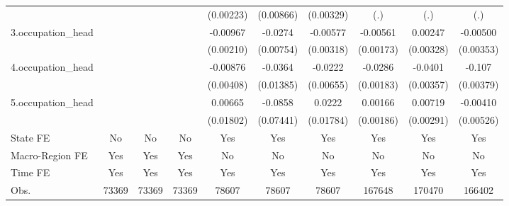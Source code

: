 \begin{table}[htbp]
{\begin{tabular}{l*{9}{c}}
            &                     &                     &                     &   (0.00223)         &   (0.00866)         &   (0.00329)         &         (.)         &         (.)         &         (.)         \\
3.occupation_head&                     &                     &                     &    -0.00967\sym{***}&     -0.0274\sym{***}&    -0.00577\sym{*}  &    -0.00561\sym{***}&     0.00247         &    -0.00500         \\
            &                     &                     &                     &   (0.00210)         &   (0.00754)         &   (0.00318)         &   (0.00173)         &   (0.00328)         &   (0.00353)         \\
4.occupation_head&                     &                     &                     &    -0.00876\sym{**} &     -0.0364\sym{***}&     -0.0222\sym{***}&     -0.0286\sym{***}&     -0.0401\sym{***}&      -0.107\sym{***}\\
            &                     &                     &                     &   (0.00408)         &   (0.01385)         &   (0.00655)         &   (0.00183)         &   (0.00357)         &   (0.00379)         \\
5.occupation_head&                     &                     &                     &     0.00665         &     -0.0858         &      0.0222         &     0.00166         &     0.00719\sym{**} &    -0.00410         \\
            &                     &                     &                     &   (0.01802)         &   (0.07441)         &   (0.01784)         &   (0.00186)         &   (0.00291)         &   (0.00526)         \\
State FE    &          No         &          No         &          No         &         Yes         &         Yes         &         Yes         &         Yes         &         Yes         &         Yes         \\
Macro-Region FE &         Yes         &         Yes         &         Yes         &          No         &          No         &          No         &          No         &          No         &          No         \\
Time FE     &         Yes         &         Yes         &         Yes         &         Yes         &         Yes         &         Yes         &         Yes         &         Yes         &         Yes         \\
\hline
Obs.        &       73369         &       73369         &       73369         &       78607         &       78607         &       78607         &      167648         &      170470         &      166402         \\

\end{tabular}}
\end{table}
